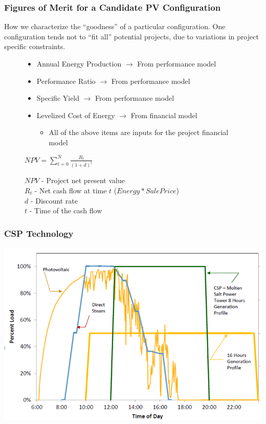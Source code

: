 \documentclass[aspectratio=169]{beamer}
\begin{document}
\begin{frame}
  \frametitle{Figures of Merit for a Candidate PV Configuration}
  How we characterize the ``goodness'' of a particular configuration.
  One configuration tends not to ``fit all'' potential projects, due
  to variations in project specific constraints. 
  
  \begin{figure}
  \begin{itemize}
  \item Annual Energy Production $\rightarrow$ From performance model
  \item Performance Ratio $\rightarrow$ From performance model
  \item Specific Yield $\rightarrow$ From performance model
  \item Levelized Cost of Energy $\rightarrow$ From financial model
    \begin{itemize}
    \item All of the above items are inputs for the project financial model
    \end{itemize}
  \end{itemize}
    
    \center
    $NPV=\displaystyle\sum\limits_{t=0}^N\frac{R_{t}}{(1+d)^t}$
  \end{figure}
  
  \begin{figure}
    \raggedright
    \scriptsize
    $NPV$ - Project net present value\\
    $R_{t}$ - Net cash flow at time $t$ ($Energy*Sale Price$)\\
    $d$ - Discount rate\\
    $t$ - Time of the cash flow
  \end{figure}
\end{frame}

\begin{frame}
  \frametitle{CSP Technology}
  \includegraphics[width=0.75\linewidth]{PV_CSP_Profiles.png}
\end{frame}
\end{document}
